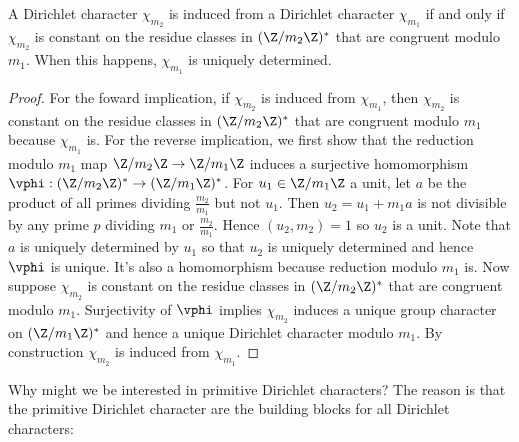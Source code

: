       \begin{proposition}\label{prop:Dirichlet_character_induction_classification}
        A Dirichlet character $\chi_{m_{2}}$ is induced from a Dirichlet character $\chi_{m_{1}}$ if and only if $\chi_{m_{2}}$ is constant on the residue classes in $(\Z/m_{2}\Z)^{\ast}$ that are congruent modulo $m_{1}$. When this happens, $\chi_{m_{1}}$ is uniquely determined.
      \end{proposition}
      \begin{proof}
        For the foward implication, if $\chi_{m_{2}}$ is induced from $\chi_{m_{1}}$, then $\chi_{m_{2}}$ is constant on the residue classes in $(\Z/m_{2}\Z)^{\ast}$ that are congruent modulo $m_{1}$ because $\chi_{m_{1}}$ is. For the reverse implication, we first show that the reduction modulo $m_{1}$ map $\Z/m_{2}\Z \to \Z/m_{1}\Z$ induces a surjective homomorphism $\vphi:(\Z/m_{2}\Z)^{\ast} \to (\Z/m_{1}\Z)^{\ast}$. For $u_{1} \in \Z/m_{1}\Z$ a unit, let $a$ be the product of all primes dividing $\frac{m_{2}}{m_{1}}$ but not $u_{1}$. Then $u_{2} = u_{1}+m_{1}a$ is not divisible by any prime $p$ dividing $m_{1}$ or $\frac{m_{2}}{m_{1}}$. Hence $(u_{2},m_{2}) = 1$ so $u_{2}$ is a unit. Note that $a$ is uniquely determined by $u_{1}$ so that $u_{2}$ is uniquely determined and hence $\vphi$ is unique. It's also a homomorphism because reduction modulo $m_{1}$ is. Now suppose $\chi_{m_{2}}$ is constant on the residue classes in $(\Z/m_{2}\Z)^{\ast}$ that are congruent modulo $m_{1}$. Surjectivity of $\vphi$ implies $\chi_{m_{2}}$ induces a unique group character on $(\Z/m_{1}\Z)^{\ast}$ and hence a unique Dirichlet character modulo $m_{1}$. By construction $\chi_{m_{2}}$ is induced from $\chi_{m_{1}}$.
      \end{proof}

      Why might we be interested in primitive Dirichlet characters? The reason is that the primitive Dirichlet character are the building blocks for all Dirichlet characters:

